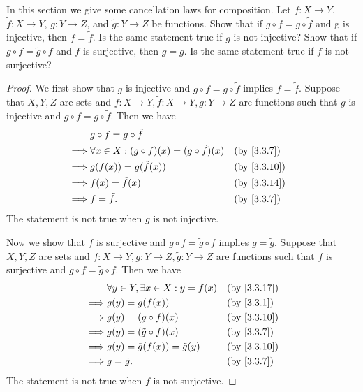 \begin{ex}\label{ex:3.3.4}
  In this section we give some cancellation laws for composition.
  Let \(f : X \to Y\), \(\tilde{f} : X \to Y\), \(g : Y \to Z\), and \(\tilde{g} : Y \to Z\) be functions.
  Show that if \(g \circ f = g \circ \tilde{f}\) and g is injective, then \(f = \tilde{f}\).
  Is the same statement true if \(g\) is not injective?
  Show that if \(g \circ f = \tilde{g} \circ f\) and \(f\) is surjective, then \(g = \tilde{g}\).
  Is the same statement true if \(f\) is not surjective?
\end{ex}

\begin{proof}
  We first show that \(g\) is injective and \(g \circ f = g \circ \tilde{f}\) implies \(f = \tilde{f}\).
  Suppose that \(X, Y, Z\) are sets and \(f : X \to Y, \tilde{f} : X \to Y, g : Y \to Z\) are functions such that \(g\) is injective and \(g \circ f = g \circ \tilde{f}\).
  Then we have
  \begin{align*}
             & g \circ f = g \circ \tilde{f}                                              \\
    \implies & \forall x \in X : (g \circ f)(x) = (g \circ \tilde{f})(x) &  & \by{3.3.7}  \\
    \implies & g(f(x)) = g(\tilde{f}(x))                                 &  & \by{3.3.10} \\
    \implies & f(x) = \tilde{f}(x)                                       &  & \by{3.3.14} \\
    \implies & f = \tilde{f}.                                            &  & \by{3.3.7}
  \end{align*}
  The statement is not true when \(g\) is not injective.

  Now we show that \(f\) is surjective and \(g \circ f = \tilde{g} \circ f\) implies \(g = \tilde{g}\).
  Suppose that \(X, Y, Z\) are sets and \(f : X \to Y, g : Y \to Z, \tilde{g} : Y \to Z\) are functions such that \(f\) is surjective and \(g \circ f = \tilde{g} \circ f\).
  Then we have
  \begin{align*}
             & \forall y \in Y, \exists x \in X : y = f(x) &  & \by{3.3.17} \\
    \implies & g(y) = g(f(x))                              &  & \by{3.3.1}  \\
    \implies & g(y) = (g \circ f)(x)                       &  & \by{3.3.10} \\
    \implies & g(y) = (\tilde{g} \circ f)(x)               &  & \by{3.3.7}  \\
    \implies & g(y) = \tilde{g}(f(x)) = \tilde{g}(y)       &  & \by{3.3.10} \\
    \implies & g = \tilde{g}.                              &  & \by{3.3.7}
  \end{align*}
  The statement is not true when \(f\) is not surjective.
\end{proof}


